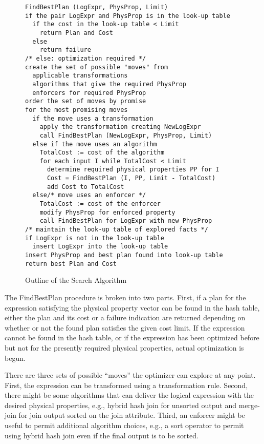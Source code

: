 \documentclass[a4paper,12pt,notitlepage,twoside,openright]{article}
\begin{document}
\begin{figure}
  \centering
  \begin{verbatim}
FindBestPlan (LogExpr, PhysProp, Limit)
if the pair LogExpr and PhysProp is in the look-up table
  if the cost in the look-up table < Limit
    return Plan and Cost
  else
    return failure
/* else: optimization required */
create the set of possible "moves" from
  applicable transformations
  algorithms that give the required PhysProp
  enforcers for required PhysProp
order the set of moves by promise
for the most promising moves
  if the move uses a transformation
    apply the transformation creating NewLogExpr
    call FindBestPlan (NewLogExpr, PhysProp, Limit)
  else if the move uses an algorithm
    TotalCost := cost of the algorithm
    for each input I while TotalCost < Limit
      determine required physical properties PP for I
      Cost = FindBestPlan (I, PP, Limit - TotalCost)
      add Cost to TotalCost
  else/* move uses an enforcer */
    TotalCost := cost of the enforcer
    modify PhysProp for enforced property
    call FindBestPlan for LogExpr with new PhysProp
/* maintain the look-up table of explored facts */
if LogExpr is not in the look-up table
  insert LogExpr into the look-up table
insert PhysProp and best plan found into look-up table
return best Plan and Cost
  \end{verbatim}
  \caption{Outline of the Search Algorithm}
\end{figure}

The FindBestPlan procedure is broken into two parts. First, if a plan
for the expression satisfying the physical property vector can be found
in the hash table, either the plan and its cost or a failure indication
are returned depending on whether or not the found plan satisfies the
given cost limit. If the expression cannot be found in the hash table,
or if the expression has been optimized before but not for the presently
required physical properties, actual optimization is begun.

There are three sets of possible ``moves'' the optimizer can explore at
any point. First, the expression can be transformed using a
transformation rule. Second, there might be some algorithms that can
deliver the logical expression with the desired physical properties,
e.g., hybrid hash join for unsorted output and merge-join for join
output sorted on the join attribute. Third, an enforcer might be useful
to permit additional algorithm choices, e.g., a sort operator to permit
using hybrid hash join even if the final output is to be sorted.
\end{document}
